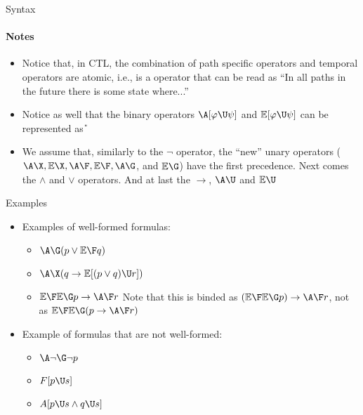\begin{frame}{Syntax}
	\framesubtitle{Notes}
	\begin{itemize}
		\item 
		{
			Notice that, in CTL, the combination of path specific operators and temporal operators are atomic, i.e., \A\F \; is a operator that can be read as ``In all paths in the future there is some state where...''
			\pause
		}
		
		\item 
		{
			Notice as well that the binary operators $\A[\varphi\U\psi]$ and $\E[\varphi\U\psi]$ can be represented as \A\U
			\pause
		}
		
		\item 
		{
			We assume that, similarly to the $\neg$ operator, the ``new'' unary operators ($\A\X, \E\X, \A\F, \E\F, \A\G $, and $ \E\G $) have the first precedence. Next comes the $\land$ and $\lor$ operators. And at last the $\to$, $\A\U$ and $\E\U$
			\pause
		}
	\end{itemize}
	
\end{frame}

\begin{frame}{Examples}
	\begin{itemize}
		\item
		{
			Examples of well-formed formulas:
			\begin{itemize}
				\item $\A\G (p \lor \E\F q)$ \pause
				\item $\A\X (q \to \E[(p\lor q) \U r])$ \pause
				\item $\E\F\E\G p \to \A\F r$ Note that this is binded as $(\E\F\E\G p) \to \A\F r$, not as $\E\F\E\G (p \to \A\F r)$
			\end{itemize}
			\pause
		}
		\item
		{
			Example of formulas that are not well-formed:
			\begin{itemize}
				\item $\A\neg\G \neg p$ \pause
				\item $F[p\U s]$ \pause
				\item $A[p\U s \land q \U s]$
			\end{itemize}
		}
	\end{itemize}
\end{frame}

